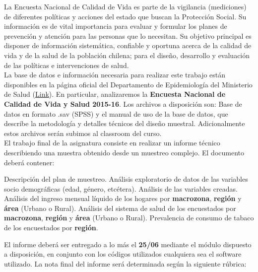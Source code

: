 
La Encuesta Nacional de Calidad de Vida es parte de la vigilancia (mediciones) de diferentes políticas y acciones del estado que buscan la Protección Social. Su información es de vital importancia para evaluar y formular los planes de prevención y atención para las personas que lo necesitan. Su objetivo principal es disponer de información sistemática, confiable y oportuna acerca de la calidad de vida y de la salud de la población chilena; para el diseño, desarrollo y evaluación de las políticas e intervenciones de salud.\\

La base de datos e información necesaria para realizar este trabajo están disponibles en la página oficial del Departamento de Epidemiología del Ministerio de Salud (\href{http://epi.minsal.cl/bases-de-datos/}{Link}). En particular, analizaremos la \textbf{Encuesta Nacional de Calidad de Vida y Salud 2015-16}. Los archivos a disposición son: Base de datos en formato .sav (SPSS) y el manual de uso de la base de datos, que describe la metodología y detalles técnicos del diseño muestral. Adicionalmente estos archivos serán subimos al classroom del curso.\\

El trabajo final de la asignatura consiste en realizar un informe técnico describiendo una muestra obtenido desde un muestreo complejo. El documento deberá contener:

\begin{questions}

\question Descripción del plan de muestreo.
\question Análisis exploratorio de datos de las variables socio demográficas (edad, género, etcétera).
\question Análisis de las variables creadas.
\question Análisis del ingreso mensual líquido de los hogares por \textbf{macrozona}, \textbf{región} y \textbf{área} (Urbano o Rural).
\question Análisis del sistema de salud de los encuestados por \textbf{macrozona}, \textbf{región} y \textbf{área} (Urbano o Rural).
\question Prevalencia de consumo de tabaco de los encuestados por \textbf{región}.
\end{questions}

El informe deberá ser entregado a lo más el \textbf{25/06} mediante el módulo dispuesto a disposición, en conjunto con los códigos utilizados cualquiera sea el software utilizado. La nota final del informe será determinada según la siguiente rúbrica:\\

